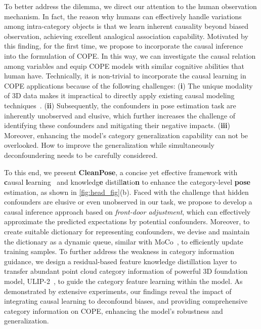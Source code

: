 To better address the dilemma, we direct our attention to the human observation mechanism. In fact, the reason why humans can effectively handle variations among intra-category objects is that we learn inherent causality beyond biased observation, achieving excellent analogical association capability.
Motivated by this finding, for the first time, we propose to incorporate the causal inference~\cite{pearl2009causality,pearl2016causal} into the formulation of COPE. In this way, we can investigate the causal relation among variables and equip COPE models with similar cognitive abilities that human have.
Technically, it is non-trivial to incorporate the causal learning in COPE applications because of the following challenges: (\textbf{i}) The unique modality of 3D data makes it impractical to directly apply existing causal modeling techniques~\cite{huang2024causalpc}. (\textbf{ii}) Subsequently, the confounders in pose estimation task are inherently unobserved and elusive, which further increases the challenge of identifying these confounders and mitigating their negative impacts. (\textbf{iii}) Moreover, enhancing the model's category generalization capability can not be overlooked. How to improve the generalization while simultaneously deconfoundering needs to be carefully considered.

To this end, we present \textbf{CleanPose}, a concise yet effective framework with \textbf{c}ausal \textbf{l}earning~\cite{pearl2009causality} and knowledg\textbf{e} distill\textbf{a}tio\textbf{n} to enhance the category-level \textbf{pose} estimation, as shown in \cref{fig:head_fig}(b).
Faced with the challenge that hidden confounders are elusive or even unobserved in our task, we propose to develop a causal inference approach based on \emph{front-door adjustment}, which can effectively approximate the predicted expectations by potential confounders.
Moreover, to create suitable dictionary for representing confounders, we devise and maintain the dictionary as a dynamic queue, similar with MoCo~\cite{he2020momentum}, to efficiently update training samples.
To further address the weakness in category information guidance, we design a residual-based feature knowledge distillation layer to transfer abundant point cloud category information of powerful 3D foundation model, ULIP-2~\cite{xue2024ulip}, to guide the category feature learning within the model.
As demonstrated by extensive experiments, our findings reveal the impact of integrating causal learning to deconfound biases, and providing comprehensive category information on COPE, enhancing the model's robustness and generalization.

